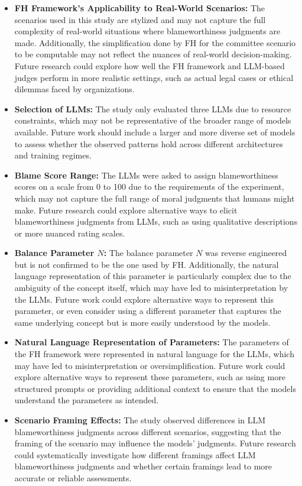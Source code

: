 \documentclass{article}
\begin{document}
\begin{itemize}
  \item \textbf{FH Framework's Applicability to Real-World Scenarios:} The scenarios used in this study are stylized and may not capture the full complexity of real-world situations where blameworthiness judgments are made. Additionally, the simplification done by FH for the committee scenario to be computable may not reflect the nuances of real-world decision-making. Future research could explore how well the FH framework and LLM-based judges perform in more realistic settings, such as actual legal cases or ethical dilemmas faced by organizations.
  
  \item \textbf{Selection of LLMs:} The study only evaluated three LLMs due to resource constraints, which may not be representative of the broader range of models available. Future work should include a larger and more diverse set of models to assess whether the observed patterns hold across different architectures and training regimes.

  \item \textbf{Blame Score Range:} The LLMs were asked to assign blameworthiness scores on a scale from 0 to 100 due to the requirements of the experiment, which may not capture the full range of moral judgments that humans might make. Future research could explore alternative ways to elicit blameworthiness judgments from LLMs, such as using qualitative descriptions or more nuanced rating scales.

  \item \textbf{Balance Parameter $N$:} The balance parameter $N$ was reverse engineered but is not confirmed to be the one used by FH. Additionally, the natural language representation of this parameter is particularly complex due to the ambiguity of the concept itself, which may have led to misinterpretation by the LLMs. Future work could explore alternative ways to represent this parameter, or even consider using a different parameter that captures the same underlying concept but is more easily understood by the models.

  \item \textbf{Natural Language Representation of Parameters:} The parameters of the FH framework were represented in natural language for the LLMs, which may have led to misinterpretation or oversimplification. Future work could explore alternative ways to represent these parameters, such as using more structured prompts or providing additional context to ensure that the models understand the parameters as intended.

  \item \textbf{Scenario Framing Effects:} The study observed differences in LLM blameworthiness judgments across different scenarios, suggesting that the framing of the scenario may influence the models' judgments. Future research could systematically investigate how different framings affect LLM blameworthiness judgments and whether certain framings lead to more accurate or reliable assessments.
\end{itemize}
\end{document}
